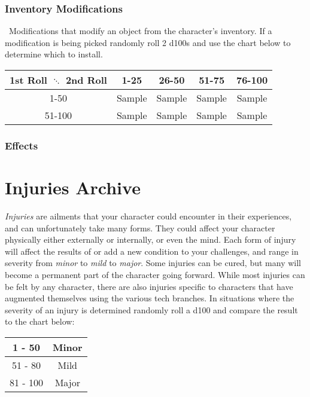 \subsection{Inventory Modifications}
\magit\ Modifications that modify an object from the character's inventory. If a modification is being picked randomly roll 2 d100s and use the chart below to determine which to install.
\begin{center}
\begin{tabular}{c | c | c | c | c}
1st Roll $\ddots$ 2nd Roll & 1-25 & 26-50 & 51-75 & 76-100 \\
\hline
1-50 & Sample & Sample & Sample & Sample\\
\hline
51-100 & Sample & Sample & Sample & Sample\\
\end{tabular}
\end{center}
\subsection*{Effects}
\begin{multicols}{2}
\end{multicols}
\clearpage

\chapter{Injuries Archive}\label{ch:ref_injure}
\emph{Injuries} are ailments that your character could encounter in their experiences, and can unfortunately take many forms. They could affect your character physically either externally or internally, or even the mind. Each form of injury will affect the results of or add a new condition to your challenges, and range in severity from \emph{minor} to \emph{mild} to \emph{major}. Some injuries can be cured, but many will become a permanent part of the character going forward. While most injuries can be felt by any character, there are also injuries specific to characters that have augmented themselves using the various tech branches.
In situations where the severity of an injury is determined randomly roll a d100 and compare the result to the chart below:
\begin{center}
\begin{tabular}{c | c}
1 - 50 & Minor \\
\hline
51 - 80 & Mild \\
\hline
81 - 100 & Major \\
\end{tabular}
\end{center}

